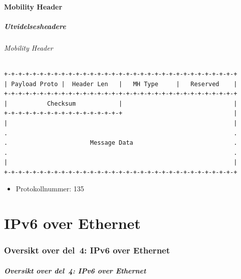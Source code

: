 \subsection{Mobility Header}
\begin{frame}[fragile]
  \frametitle{Utvidelsesheadere}
  \framesubtitle{Mobility Header}
\begin{Verbatim}[fontsize=\tiny]
+-+-+-+-+-+-+-+-+-+-+-+-+-+-+-+-+-+-+-+-+-+-+-+-+-+-+-+-+-+-+-+-+
| Payload Proto |  Header Len   |   MH Type     |   Reserved    |
+-+-+-+-+-+-+-+-+-+-+-+-+-+-+-+-+-+-+-+-+-+-+-+-+-+-+-+-+-+-+-+-+
|           Checksum            |                               |
+-+-+-+-+-+-+-+-+-+-+-+-+-+-+-+-+                               |
|                                                               |
.                                                               .
.                       Message Data                            .
.                                                               .
|                                                               |
+-+-+-+-+-+-+-+-+-+-+-+-+-+-+-+-+-+-+-+-+-+-+-+-+-+-+-+-+-+-+-+-+
\end{Verbatim}

  \begin{itemize}
  \item Protokollnummer: 135
  \end{itemize}
\end{frame}

\part{IPv6 over Ethernet}

\begin{frame}
  \partpage
\end{frame}

\section*{Oversikt over del~4: IPv6 over Ethernet}
\begin{frame}
  \frametitle{Oversikt over del~4: IPv6 over Ethernet}
    \tableofcontents
\end{frame}

